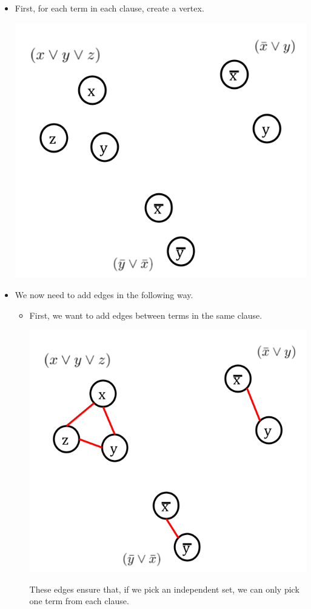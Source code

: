 \documentclass[letterpaper]{article}
\begin{document}
\begin{itemize}
    \item First, for each term in each clause, create a vertex.
    \begin{center}
        \includegraphics[scale=0.4]{assets/3sat_mis_1.png}
    \end{center}

    \item We now need to add edges in the following way. 
    \begin{itemize}
        \item First, we want to add edges between terms in the same clause.
        \begin{center}
            \includegraphics[scale=0.4]{assets/3sat_mis_2.png}
        \end{center}
        These edges ensure that, if we pick an independent set, we can only pick one term from each clause. 


\end{itemize}
\end{itemize}
\end{document}
